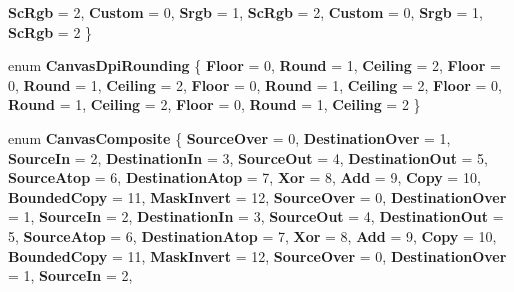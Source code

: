 \begin{DoxyCompactItemize}
{\bfseries Sc\+Rgb} = 2, 
{\bfseries Custom} = 0, 
{\bfseries Srgb} = 1, 
{\bfseries Sc\+Rgb} = 2, 
\newline
{\bfseries Custom} = 0, 
{\bfseries Srgb} = 1, 
{\bfseries Sc\+Rgb} = 2
 \}
\item 
\mbox{\label{namespace_microsoft_1_1_graphics_1_1_canvas_aaf9bdf2614ae3a2c3978ef7522070d82}} 
enum {\bfseries Canvas\+Dpi\+Rounding} \{ \newline
{\bfseries Floor} = 0, 
{\bfseries Round} = 1, 
{\bfseries Ceiling} = 2, 
{\bfseries Floor} = 0, 
\newline
{\bfseries Round} = 1, 
{\bfseries Ceiling} = 2, 
{\bfseries Floor} = 0, 
{\bfseries Round} = 1, 
\newline
{\bfseries Ceiling} = 2, 
{\bfseries Floor} = 0, 
{\bfseries Round} = 1, 
{\bfseries Ceiling} = 2, 
\newline
{\bfseries Floor} = 0, 
{\bfseries Round} = 1, 
{\bfseries Ceiling} = 2
 \}
\item 
\mbox{\label{namespace_microsoft_1_1_graphics_1_1_canvas_ad4d6dae38d1a118a5742bdb597529f1e}} 
enum {\bfseries Canvas\+Composite} \{ \newline
{\bfseries Source\+Over} = 0, 
{\bfseries Destination\+Over} = 1, 
{\bfseries Source\+In} = 2, 
{\bfseries Destination\+In} = 3, 
\newline
{\bfseries Source\+Out} = 4, 
{\bfseries Destination\+Out} = 5, 
{\bfseries Source\+Atop} = 6, 
{\bfseries Destination\+Atop} = 7, 
\newline
{\bfseries Xor} = 8, 
{\bfseries Add} = 9, 
{\bfseries Copy} = 10, 
{\bfseries Bounded\+Copy} = 11, 
\newline
{\bfseries Mask\+Invert} = 12, 
{\bfseries Source\+Over} = 0, 
{\bfseries Destination\+Over} = 1, 
{\bfseries Source\+In} = 2, 
\newline
{\bfseries Destination\+In} = 3, 
{\bfseries Source\+Out} = 4, 
{\bfseries Destination\+Out} = 5, 
{\bfseries Source\+Atop} = 6, 
\newline
{\bfseries Destination\+Atop} = 7, 
{\bfseries Xor} = 8, 
{\bfseries Add} = 9, 
{\bfseries Copy} = 10, 
\newline
{\bfseries Bounded\+Copy} = 11, 
{\bfseries Mask\+Invert} = 12, 
{\bfseries Source\+Over} = 0, 
{\bfseries Destination\+Over} = 1, 
\newline
{\bfseries Source\+In} = 2, 

\end{DoxyCompactItemize}
